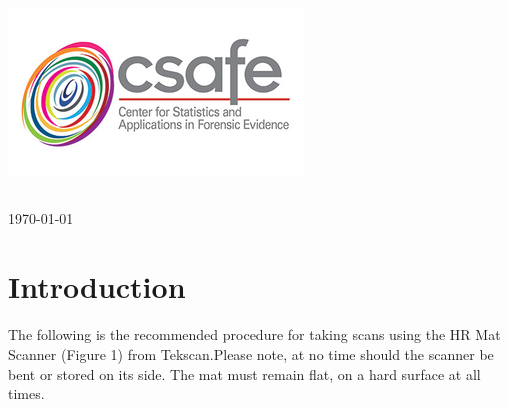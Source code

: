 \begin{titlepage}
\includegraphics[scale=.5]{Logo}\\[1cm]


\begin{center}
\begin{tabular}{ c   |   c } 
\end{tabular}
\end{center}



{\large \today}\\[2cm] %


\vfill %

\end{titlepage}




\section{Introduction}

The following is the recommended procedure for taking scans using the HR Mat Scanner (Figure 1) from Tekscan.Please note, at no time should the scanner be bent or stored on its side. The mat must remain flat, on a hard surface at all times. 

